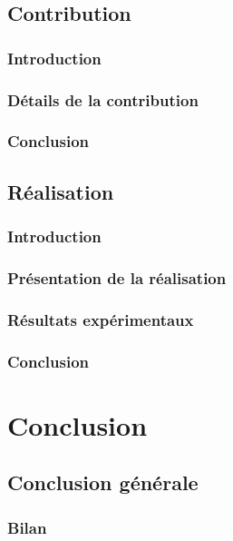 \documentclass[french]{spimubphdthesis}
\begin{document}
\chapter{Contribution}

\section{Introduction}

\section{Détails de la contribution}

\section{Conclusion}

\chapter{Réalisation}

\section{Introduction}

\section{Présentation de la réalisation}

\section{Résultats expérimentaux}

\section{Conclusion}

\part{Conclusion}

\chapter{Conclusion générale}
 
\section{Bilan}
\end{document}
